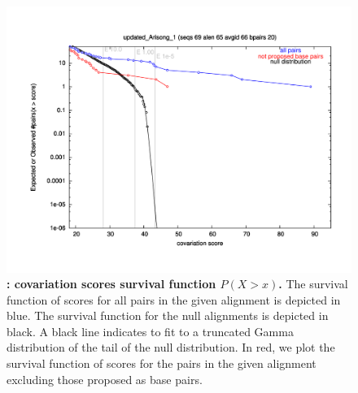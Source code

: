  \begin{figure}[h] \includegraphics[scale=0.50]{Arisong_his.pdf} 
 \caption{\small\textbf{:
 covariation scores survival function $P(X>x)$.}  The survival
 function of scores for all pairs in the given alignment is depicted
 in blue. The survival function for the null alignments is depicted in
 black. A black line indicates to fit to a truncated Gamma
 distribution of the tail of the null distribution. In red, we plot
 the survival function of scores for the pairs in the given alignment
 excluding those proposed as base
 pairs.}  \label{fig:surv} \end{figure}

